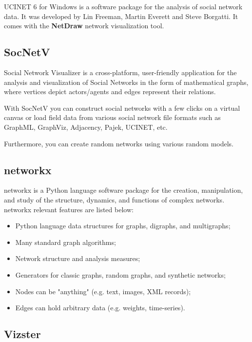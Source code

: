 \indent \indent UCINET 6 \citep{ucinet-software} for Windows is a software package for the analysis of social network data. It was developed by Lin Freeman, Martin Everett and Steve Borgatti. It comes with the \textbf{NetDraw} \citep{borgatti2002netdraw} network visualization tool.

\subsection{SocNetV}

\indent \indent Social Network Visualizer \citep{socnetv} is a cross-platform, user-friendly application for the analysis and visualization of Social Networks in the form of mathematical graphs, where vertices depict actors/agents and edges represent their relations.

With SocNetV you can construct social networks with a few clicks on a virtual canvas or load field data from various social network file formats such as GraphML, GraphViz, Adjacency, Pajek, UCINET, etc.

Furthermore, you can create random networks using various random models.

\subsection{networkx}
\indent \indent networkx \citep{hagberg2013networkx} is a Python language software package for the creation, manipulation, and study of the structure, dynamics, and functions of complex networks. networkx relevant features are listed below:
\begin{itemize}
    \item Python language data structures for graphs, digraphs, and multigraphs;
    \item Many standard graph algorithms;
    \item Network structure and analysis measures;
    \item Generators for classic graphs, random graphs, and synthetic networks;
    \item Nodes can be "anything" (e.g. text, images, XML records);
    \item Edges can hold arbitrary data (e.g. weights, time-series).
\end{itemize}

\subsection{Vizster}

